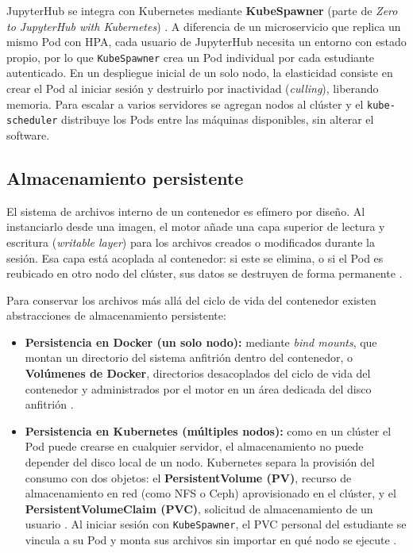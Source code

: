 JupyterHub se integra con Kubernetes mediante \textbf{KubeSpawner} (parte de \textit{Zero to JupyterHub with Kubernetes}) \cite{z2jh_architecture_2024}. A diferencia de un microservicio que replica un mismo Pod con HPA, cada usuario de JupyterHub necesita un entorno con estado propio, por lo que \texttt{KubeSpawner} crea un Pod individual por cada estudiante autenticado. En un despliegue inicial de un solo nodo, la elasticidad consiste en crear el Pod al iniciar sesión y destruirlo por inactividad (\textit{culling}), liberando memoria. Para escalar a varios servidores se agregan nodos al clúster y el \texttt{kube-scheduler} distribuye los Pods entre las máquinas disponibles, sin alterar el software.

\subsection{Almacenamiento persistente}
\label{subsec:almacenamiento_persistente}

El sistema de archivos interno de un contenedor es efímero por diseño. Al instanciarlo desde una imagen, el motor añade una capa superior de lectura y escritura (\textit{writable layer}) para los archivos creados o modificados durante la sesión. Esa capa está acoplada al contenedor: si este se elimina, o si el Pod es reubicado en otro nodo del clúster, sus datos se destruyen de forma permanente \cite{docker_storage_2024, k8s_volumes_2024}.

Para conservar los archivos más allá del ciclo de vida del contenedor existen abstracciones de almacenamiento persistente:

\begin{itemize}
    \item \textbf{Persistencia en Docker (un solo nodo):} mediante \textit{bind mounts}, que montan un directorio del sistema anfitrión dentro del contenedor, o \textbf{Volúmenes de Docker}, directorios desacoplados del ciclo de vida del contenedor y administrados por el motor en un área dedicada del disco anfitrión \cite{docker_storage_2024}.
    \item \textbf{Persistencia en Kubernetes (múltiples nodos):} como en un clúster el Pod puede crearse en cualquier servidor, el almacenamiento no puede depender del disco local de un nodo. Kubernetes separa la provisión del consumo con dos objetos: el \textbf{PersistentVolume (PV)}, recurso de almacenamiento en red (como NFS o Ceph) aprovisionado en el clúster, y el \textbf{PersistentVolumeClaim (PVC)}, solicitud de almacenamiento de un usuario \cite{k8s_pv_2024}. Al iniciar sesión con \texttt{KubeSpawner}, el PVC personal del estudiante se vincula a su Pod y monta sus archivos sin importar en qué nodo se ejecute \cite{z2jh_storage_2024}.
\end{itemize}


